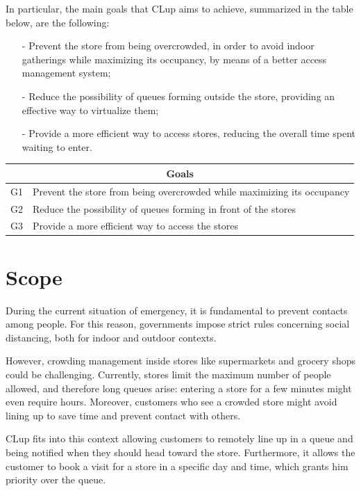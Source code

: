 \documentclass[a4paper,oneside,11pt]{book}   %
\begin{document}
    In particular, the main goals that CLup aims to achieve, summarized in the table below, are the following: 
    \begin{itemize}
        \item[-] Prevent the store from being overcrowded, in order to avoid indoor gatherings while maximizing its occupancy, by means of a better access management system;
        \item[-] Reduce the possibility of queues forming outside the store, providing an effective way to virtualize them;
        \item[-] Provide a more efficient way to access stores, reducing the overall time spent waiting to enter.
    \end{itemize}
    
    \begin{center}
        \begin{tabular}{ |c|p{9cm}|}
            \hline
            \multicolumn{2}{|c|}{Goals} \\
            \hline
            G1 & Prevent the store from being overcrowded while maximizing its occupancy \\
            \hline
            G2 & Reduce the possibility of queues forming in front of the stores         \\
            \hline
            G3 & Provide a more efficient way to access the stores                       \\
            \hline
        \end{tabular}
    \end{center}
    
    \section{Scope}
    During the current situation of emergency, it is fundamental to prevent contacts among people. For this reason, governments impose strict rules concerning social distancing, both for indoor and outdoor contexts.
    
    However, crowding management inside stores like supermarkets and grocery shops could be challenging. Currently, stores limit the maximum number of people allowed, and therefore long queues arise: entering a store for a few minutes might even require hours. Moreover, customers who see a crowded store might avoid lining up to save time and prevent contact with others.
    
    CLup fits into this context allowing customers to remotely line up in a queue and being notified when they should head toward the store. Furthermore, it allows the customer to book a visit for a store in a specific day and time, which grants him priority over the queue. 
    
\end{document}
